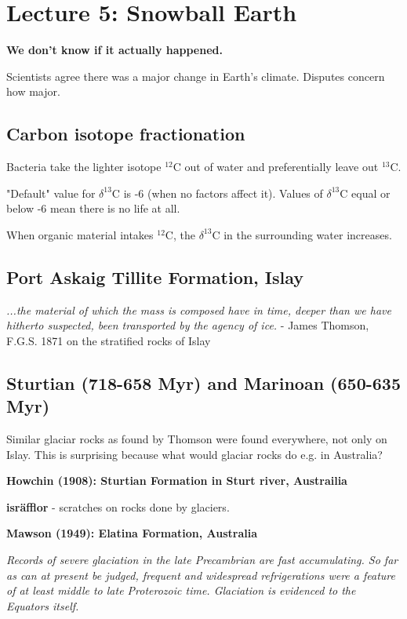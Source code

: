 
\section{Lecture 5: Snowball Earth}

\textbf{We don't know if it actually happened.}

Scientists agree there was a major change in Earth's climate. Disputes concern
how major.

\subsection{Carbon isotope fractionation}

Bacteria take the lighter isotope $^{12}$C out of water and preferentially
leave out $^{13}$C.

"Default" value for $\delta^{13}$C is -6 (when no factors affect it).
Values of $\delta^{13}$C equal or below -6 mean there is no life at all.

When organic material intakes $^{12}$C, the $\delta^{13}$C in the surrounding
water increases.

\subsection{Port Askaig Tillite Formation, Islay}

\textit{...the material of which the mass is composed have in time, deeper than
we have hitherto suspected, been transported by the agency of ice.} - James
Thomson, F.G.S. 1871 on the stratified rocks of Islay

\subsection{Sturtian (718-658 Myr) and Marinoan (650-635 Myr)}

Similar glaciar rocks as found by Thomson were found everywhere, not only
on Islay. This is surprising because what would glaciar rocks do e.g. in
Australia?

\textbf{Howchin (1908): Sturtian Formation in Sturt river,
Austrailia}

\textbf{isräfflor} - scratches on rocks done by glaciers.

\textbf{Mawson (1949): Elatina Formation, Australia}

\textit{Records of severe glaciation in the late Precambrian are fast
accumulating. So far as can at present be judged, frequent and widespread
refrigerations were a feature of at least middle to late Proterozoic time.
Glaciation is evidenced to the Equators itself.
}
